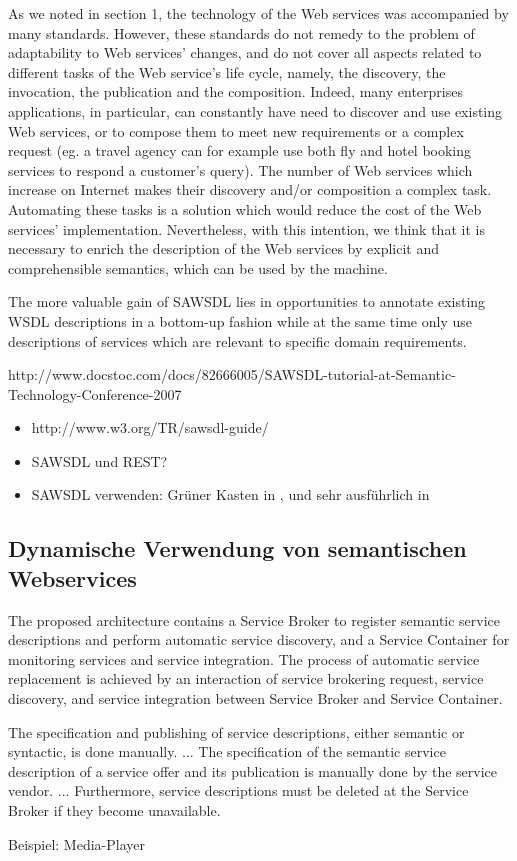 As we noted in section 1, the technology of the Web
services was accompanied by many standards. However,
these standards do not remedy to the problem of adaptability
to Web services’ changes, and do not cover all aspects related
to different tasks of the Web service’s life cycle, namely, the
discovery, the invocation, the publication and the
composition. Indeed, many enterprises applications, in
particular, can constantly have need to discover and use
existing Web services, or to compose them to meet new
requirements or a complex request (eg. a travel agency can
for example use both fly and hotel booking services to
respond a customer’s query). The number of Web services
which increase on Internet makes their discovery and/or
composition a complex task. Automating these tasks is a
solution which would reduce the cost of the Web services’
implementation. Nevertheless, with this intention, we think
that it is necessary to enrich the description of the Web
services by explicit and comprehensible semantics, which can
be used by the machine. \cite{ei-sawsdl}

The more valuable
gain of SAWSDL lies in opportunities to annotate existing
WSDL descriptions in a bottom-up fashion while at the
same time only use descriptions of services which are relevant
to specific domain requirements. \cite{WSMOLITE}

http://www.docstoc.com/docs/82666005/SAWSDL-tutorial-at-Semantic-Technology-Conference-2007

\begin{itemize}
\item http://www.w3.org/TR/sawsdl-guide/
\item \ac{SAWSDL} und \ac{REST}? \cite{xn-sss}
\item \ac{SAWSDL} verwenden: Grüner Kasten in \cite[S.63]{ky-sawsdl}, \cite{flexbrok} und sehr ausführlich in \cite{vr-sesa}
\end{itemize}

\subsection{Dynamische Verwendung von semantischen Webservices}

The proposed architecture contains a Service Broker to
register semantic service descriptions and perform automatic
service discovery, and a Service Container for monitoring
services and service integration. The process of automatic
service replacement is achieved by an interaction of service
brokering request, service discovery, and service integration
between Service Broker and Service Container. \cite[S.410]{flexbrok}

The specification
and publishing of service descriptions, either semantic
or syntactic, is done manually. ... The specification
of the semantic service description of a service offer and its
publication is manually done by the service vendor. ... Furthermore, service descriptions must be deleted at the
Service Broker if they become unavailable. \cite[S.416]{flexbrok}

Beispiel: Media-Player \cite[S.418]{flexbrok}
